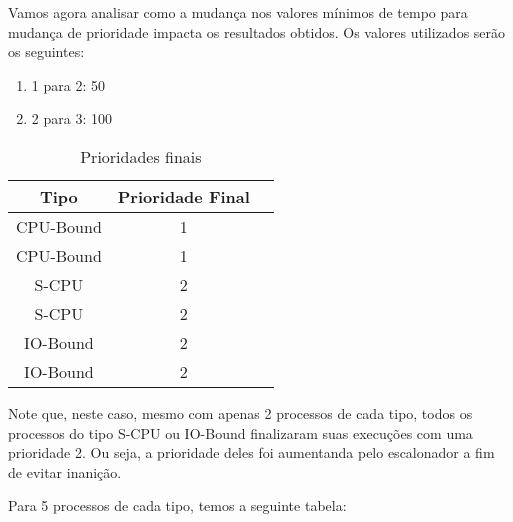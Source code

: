 \documentclass{article}
\begin{document}
Vamos agora analisar como a mudança nos valores mínimos de tempo para mudança
de prioridade impacta os resultados obtidos. Os valores utilizados serão os
seguintes:

\begin{enumerate}
      \item 1 para 2: 50
      \item 2 para 3: 100
\end{enumerate}

\begin{table}[H]
      \centering
      \begin{tabular}{|c|c|c|}
            \hline
            \textbf{Tipo} & \textbf{Prioridade Final} \\
            \hline
            CPU-Bound     & 1                         \\
            CPU-Bound     & 1                         \\
            S-CPU         & 2                         \\
            S-CPU         & 2                         \\
            IO-Bound      & 2                         \\
            IO-Bound      & 2                         \\
            \hline
      \end{tabular}
      \caption{Prioridades finais}
\end{table}

Note que, neste caso, mesmo com apenas 2 processos de cada tipo, todos os
processos do tipo S-CPU ou IO-Bound finalizaram suas execuções com uma
prioridade 2. Ou seja, a prioridade deles foi aumentanda pelo escalonador a fim
de evitar inanição.

Para 5 processos de cada tipo, temos a seguinte tabela:
\end{document}
